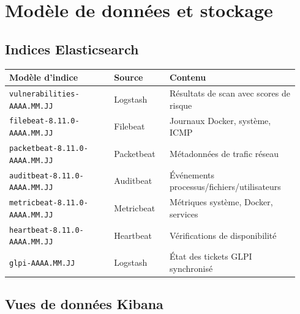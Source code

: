 
\section{Mod\`ele de donn\'ees et stockage}

\subsection{Indices Elasticsearch}

\begin{center}
\small
\begin{longtable}{@{}p{0.34\linewidth} p{0.18\linewidth} p{0.42\linewidth}@{}}
\toprule
\textbf{Mod\`ele d'indice} & \textbf{Source} & \textbf{Contenu} \\
\midrule
\endhead
\bottomrule
\endlastfoot
\texttt{vulnerabilities-AAAA.MM.JJ} & Logstash & R\'esultats de scan avec scores de risque \\
\texttt{filebeat-8.11.0-AAAA.MM.JJ} & Filebeat & Journaux Docker, syst\`eme, ICMP \\
\texttt{packetbeat-8.11.0-AAAA.MM.JJ} & Packetbeat & M\'etadonn\'ees de trafic r\'eseau \\
\texttt{auditbeat-8.11.0-AAAA.MM.JJ} & Auditbeat & \'Ev\'enements processus/fichiers/utilisateurs \\
\texttt{metricbeat-8.11.0-AAAA.MM.JJ} & Metricbeat & M\'etriques syst\`eme, Docker, services \\
\texttt{heartbeat-8.11.0-AAAA.MM.JJ} & Heartbeat & V\'erifications de disponibilit\'e \\
\texttt{glpi-AAAA.MM.JJ} & Logstash & \'Etat des tickets GLPI synchronis\'e \\
\bottomrule
\end{longtable}
\end{center}

\subsection{Vues de donn\'ees Kibana}

